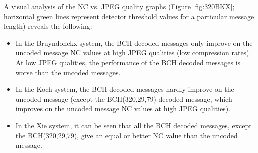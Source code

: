 \documentclass[12pt]{report}
\begin{document}
A visual analysis of the NC vs. JPEG quality graphs 
(Figure \ref{fig:320BKX}; horizontal green lines represent detector threshold values for a 
particular message length)
reveals the following: 
\begin{itemize}
	\item In the Bruyndonckx system, 
	the BCH decoded messages only improve on the uncoded 
	message NC values at high JPEG qualities (low compression rates).
	At low JPEG qualities, the performance of
	the BCH decoded messages is worse than the uncoded messages.
	\item In the Koch system, the BCH decoded messages hardly improve on the
	uncoded message (except the BCH(320,29,79) decoded message, 
	which improves on the uncoded message NC values
	at high JPEG qualities).
	\item In the Xie system, it can be seen that all the BCH decoded messages, except
	the BCH(320,29,79), give an equal or better NC value than the uncoded message.
\end{itemize}
\end{document}
